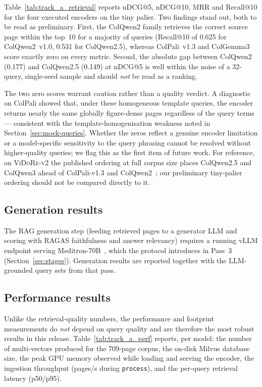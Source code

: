 \documentclass[10pt,a4paper]{article}
\begin{document}
Table~\ref{tab:track_a_retrieval} reports nDCG@5, nDCG@10, MRR and
Recall@10 for the four executed encoders on the tiny palier. Two findings
stand out, both to be read as preliminary. First, the ColQwen2 family
retrieves the correct source page within the top~10 for a majority of
queries (Recall@10 of 0.625 for ColQwen2~v1.0, 0.531 for ColQwen2.5),
whereas ColPali~v1.3 and ColGemma3 score exactly zero on every metric.
Second, the absolute gap between ColQwen2 (0.177) and ColQwen2.5 (0.149) at
nDCG@5 is well within the noise of a 32-query, single-seed sample and should
\emph{not} be read as a ranking.

The two zero scores warrant caution rather than a quality verdict. A
diagnostic on ColPali showed that, under these homogeneous template queries,
the encoder returns nearly the same globally figure-dense pages regardless of
the query terms --- consistent with the template-homogenisation weakness
noted in Section~\ref{sec:mock-queries}. Whether the zeros reflect a genuine
encoder limitation or a model-specific sensitivity to the query phrasing
cannot be resolved without higher-quality queries; we flag this as the first
item of future work. For reference, on \textsc{ViDoRe-v2} the published
ordering at full corpus size places ColQwen2.5 and ColQwen3 ahead of
ColPali-v1.3 and ColQwen2~\cite{faysse2024vidore}; our preliminary tiny-palier
ordering should not be compared directly to it.

\subsection{Generation results}

The RAG generation step (feeding retrieved pages to a generator LLM and
scoring with RAGAS faithfulness and answer relevancy) requires a running
vLLM endpoint serving Meditron-70B~\cite{chen2023meditron}, which the protocol
introduces in Pass~3 (Section~\ref{sec:stages}). Generation results are
reported together with the LLM-grounded query sets from that pass.

\subsection{Performance results}

Unlike the retrieval-quality numbers, the performance and footprint
measurements do \emph{not} depend on query quality and are therefore the
most robust results in this release. Table~\ref{tab:track_a_perf} reports,
per model: the number of multi-vectors produced for the 709-page corpus,
the on-disk Milvus database size, the peak GPU memory observed while loading
and serving the encoder, the ingestion throughput
(pages/s during \texttt{process}), and the per-query retrieval latency
(p50/p95).
\end{document}
